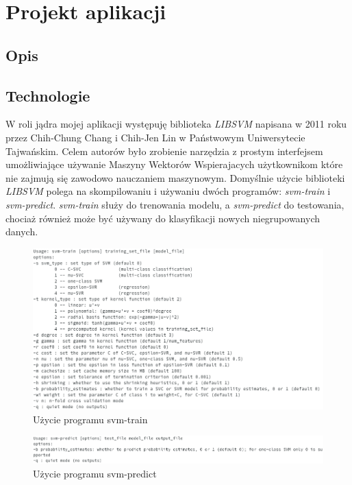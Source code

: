 \documentclass[paper=a4, fontsize=11pt]{scrartcl} %
\numberwithin{equation}{section} %
\numberwithin{figure}{section} %
\begin{document}
\newpage
\section{Projekt aplikacji} %
\subsection{Opis}
\subsection{Technologie}
    \par W roli jądra mojej aplikacji występuję biblioteka \textit{LIBSVM} napisana w 2011 roku
    przez Chih-Chung Chang i Chih-Jen Lin w Państwowym Uniwersytecie Tajwańskim. Celem autorów
    było zrobienie narzędzia z prostym interfejsem umożliwiające używanie Maszyny Wektorów
    Wspierajacych użytkownikom które nie zajmują się zawodowo nauczaniem maszynowym. Domyślnie
    użycie biblioteki \textit{LIBSVM} polega na skompilowaniu i używaniu dwóch programów:
    \textit{svm-train} i \textit{svm-predict}. \textit{svm-train} służy do trenowania modelu, 
    a \textit{svm-predict} do testowania, chociaż również może być używany do klasyfikacji
    nowych niegrupowanych danych. 

    \begin{figure}[h]
        \begin{center}
            \includegraphics[scale=0.6]{./img/svm_train_usage.png}
            \caption{Użycie programu svm-train}
            \label{fig:train_usage}
        \end{center}
    \end{figure}

    \begin{figure}[h]
        \begin{center}
            \includegraphics[scale=0.6]{./img/svm_predict_usage.png}
            \caption{Użycie programu svm-predict}
            \label{fig:predict_usage}
        \end{center}
    \end{figure}
\end{document}
